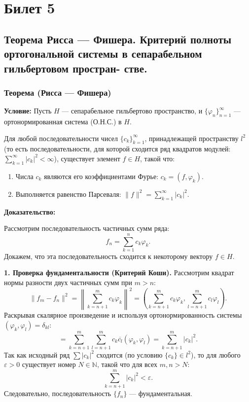 \documentclass[12pt,a4paper,openany]{book}
\begin{document}
\chapter{Билет 5}
\section{ Теорема Рисса — Фишера. Критерий полноты ортогональной системы в сепарабельном гильбертовом простран-
стве.}
\subsection{Теорема (Рисса — Фишера)}

\textbf{Условие:}
Пусть $H$ — сепарабельное гильбертово пространство, и $\{\varphi_n\}_{n=1}^\infty$ — ортонормированная система (О.Н.С.) в $H$.

Для любой последовательности чисел $\{c_k\}_{k=1}^\infty$, принадлежащей пространству $l^2$ (то есть последовательности, для которой сходится ряд квадратов модулей: $\sum_{k=1}^\infty |c_k|^2 < \infty$), существует элемент $f \in H$, такой что:
\begin{enumerate}
    \item Числа $c_k$ являются его коэффициентами Фурье: $c_k = (f, \varphi_k)$.
    \item Выполняется равенство Парсеваля: $\|f\|^2 = \sum_{k=1}^\infty |c_k|^2$.
\end{enumerate}

\textbf{Доказательство:}

Рассмотрим последовательность частичных сумм ряда:
\[
f_n = \sum_{k=1}^n c_k \varphi_k.
\]
Докажем, что эта последовательность сходится к некоторому вектору $f \in H$.

\textbf{1. Проверка фундаментальности (Критерий Коши).}
Рассмотрим квадрат нормы разности двух частичных сумм при $m > n$:
\[
\|f_m - f_n\|^2 = \left\| \sum_{k=n+1}^m c_k \varphi_k \right\|^2 = \left( \sum_{k=n+1}^m c_k \varphi_k, \sum_{l=n+1}^m c_l \varphi_l \right).
\]
Раскрывая скалярное произведение и используя ортонормированность системы $(\varphi_k, \varphi_l) = \delta_{kl}$:
\[
= \sum_{k=n+1}^m \sum_{l=n+1}^m c_k \overline{c_l} (\varphi_k, \varphi_l) = \sum_{k=n+1}^m |c_k|^2.
\]
Так как исходный ряд $\sum |c_k|^2$ сходится (по условию $\{c_k\} \in l^2$), то для любого $\varepsilon > 0$ существует номер $N \in \mathbb{N}$, такой что для всех $m, n > N$:
\[
\sum_{k=n+1}^m |c_k|^2 < \varepsilon.
\]
Следовательно, последовательность $\{f_n\}$ — фундаментальная.
\end{document}
